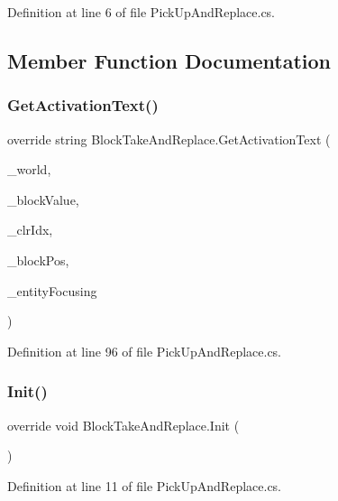 Definition at line 6 of file Pick\+Up\+And\+Replace.\+cs.



\subsection{Member Function Documentation}
\mbox{\label{class_block_take_and_replace_af4a8e2aeb473d7f8eca262210128b9b1}} 
\subsubsection{\texorpdfstring{GetActivationText()}{GetActivationText()}}
{\footnotesize\ttfamily override string Block\+Take\+And\+Replace.\+Get\+Activation\+Text (\begin{DoxyParamCaption}\item[{global\+::\+World\+Base}]{\+\_\+world,  }\item[{global\+::\+Block\+Value}]{\+\_\+block\+Value,  }\item[{int}]{\+\_\+clr\+Idx,  }\item[{global\+::\+Vector3i}]{\+\_\+block\+Pos,  }\item[{global\+::\+Entity\+Alive}]{\+\_\+entity\+Focusing }\end{DoxyParamCaption})}



Definition at line 96 of file Pick\+Up\+And\+Replace.\+cs.

\mbox{\label{class_block_take_and_replace_a2ca56402006143682cadc4b7d6b20d17}} 
\subsubsection{\texorpdfstring{Init()}{Init()}}
{\footnotesize\ttfamily override void Block\+Take\+And\+Replace.\+Init (\begin{DoxyParamCaption}{ }\end{DoxyParamCaption})}



Definition at line 11 of file Pick\+Up\+And\+Replace.\+cs.

